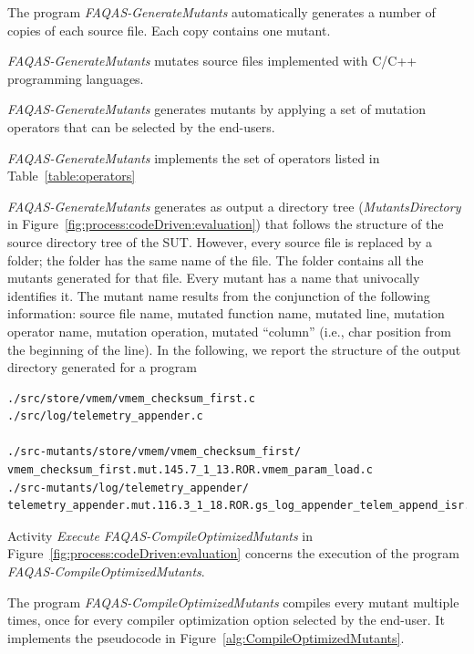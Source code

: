 The program \emph{FAQAS-GenerateMutants} automatically generates a number of copies of each source file. Each copy contains one mutant.

\emph{FAQAS-GenerateMutants} mutates source files implemented with C/C++ programming languages.


\emph{FAQAS-GenerateMutants} generates mutants by applying a set of mutation operators that can be selected by the end-users.

\emph{FAQAS-GenerateMutants} implements the set of operators listed in Table~\ref{table:operators}



\emph{FAQAS-GenerateMutants} generates as output a directory tree (\emph{MutantsDirectory} in Figure~\ref{fig:process:codeDriven:evaluation}) that follows the structure of the source directory tree of the SUT. However, every source file is replaced by a folder; the folder has the same name of the file. The folder contains all the mutants generated for that file. Every mutant has a name that univocally identifies it. The mutant name results from the conjunction of the following information:
source file name, mutated function name, mutated line, mutation operator name, mutation operation, mutated ``column'' (i.e., char position from the beginning of the line).
In the following, we report the structure of the output directory generated for a program

\begin{verbatim}
./src/store/vmem/vmem_checksum_first.c
./src/log/telemetry_appender.c

./src-mutants/store/vmem/vmem_checksum_first/
vmem_checksum_first.mut.145.7_1_13.ROR.vmem_param_load.c
./src-mutants/log/telemetry_appender/
telemetry_appender.mut.116.3_1_18.ROR.gs_log_appender_telem_append_isr.c
\end{verbatim}


Activity \emph{Execute FAQAS-CompileOptimizedMutants} in Figure~\ref{fig:process:codeDriven:evaluation} concerns the execution of the program \emph{FAQAS-CompileOptimizedMutants}.

The program \emph{FAQAS-CompileOptimizedMutants} compiles every mutant multiple times, once for every compiler optimization option selected by the end-user. It implements the pseudocode in Figure~\ref{alg:CompileOptimizedMutants}.

